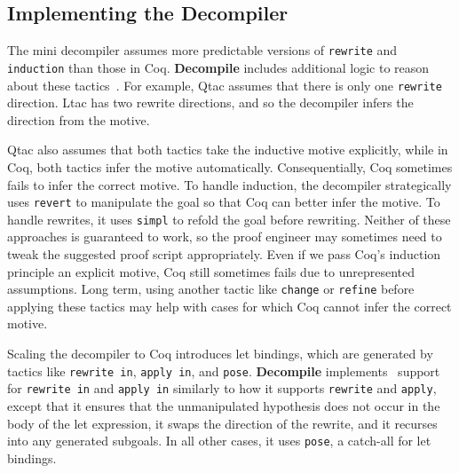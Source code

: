 \subsection{Implementing the Decompiler}
\label{sec:second}

The mini decompiler assumes more predictable versions of \lstinline{rewrite} and \lstinline{induction}
than those in Coq. \textbf{Decompile} includes additional logic to reason about these tactics~\href{https://github.com/uwplse/coq-plugin-lib/blob/9ef05815c261de9c99b604c6b581ba1c4fbc1a46/src/coq/decompiler/decompiler.ml}{}. %
For example, Qtac assumes that there is only one \lstinline{rewrite} direction. Ltac has two rewrite directions,
and so the decompiler infers the direction from the motive.

Qtac also assumes that both tactics take the inductive motive explicitly,
while in Coq, both tactics infer the motive automatically.
Consequentially, Coq sometimes fails to infer the correct motive.
To handle induction, the decompiler strategically uses \lstinline{revert} to manipulate the goal
so that Coq can better infer the motive.
To handle rewrites, it uses \lstinline{simpl} to refold the goal before rewriting.
Neither of these approaches is guaranteed to work, so the proof engineer may sometimes need to tweak the suggested proof script appropriately.
Even if we pass Coq's induction principle an explicit motive, Coq still sometimes fails due
to unrepresented assumptions.
Long term, using another tactic like \lstinline{change} or \lstinline{refine} before applying these tactics
may help with cases for which Coq cannot infer the correct motive.

Scaling the decompiler to Coq introduces let bindings, which are generated by 
tactics like \lstinline{rewrite in}, \lstinline{apply in}, and \lstinline{pose}.
\textbf{Decompile} implements~\href{https://github.com/uwplse/coq-plugin-lib/blob/9ef05815c261de9c99b604c6b581ba1c4fbc1a46/src/coq/decompiler/decompiler.ml}{} %
support for \lstinline{rewrite in} and \lstinline{apply in} similarly to how it supports
\lstinline{rewrite} and \lstinline{apply}, except that it ensures that the unmanipulated hypothesis does not occur in the body of the let expression,
it swaps the direction of the rewrite, and it recurses into any generated subgoals.
In all other cases, it uses \lstinline{pose}, a catch-all for let bindings.

